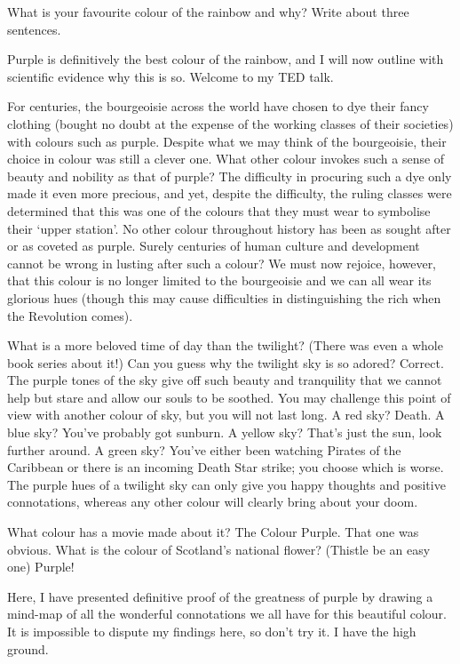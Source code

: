 \documentclass[a4paper,12pt,answers]{exam}
\begin{document}
\begin{questions}
    \newpage
\begin{center}
\end{center}

\question What is your favourite colour of the rainbow and why? Write about three sentences.

Purple is definitively the best colour of the rainbow, and I will now outline with scientific evidence why this is so. 
Welcome to my TED talk. 

For centuries, the bourgeoisie across the world have chosen to dye their fancy clothing (bought no doubt at the expense of the working classes of their societies) with colours such as purple. 
Despite what we may think of the bourgeoisie, their choice in colour was still a clever one. 
What other colour invokes such a sense of beauty and nobility as that of purple?
The difficulty in procuring such a dye only made it even more precious, and yet, despite the difficulty, the ruling classes were determined that this was one of the colours that they must wear to symbolise their `upper station'.
No other colour throughout history has been as sought after or as coveted as purple. 
Surely centuries of human culture and development cannot be wrong in lusting after such a colour?
We must now rejoice, however, that this colour is no longer limited to the bourgeoisie and we can all wear its glorious hues (though this may cause difficulties in distinguishing the rich when the Revolution comes).

What is a more beloved time of day than the twilight? (There was even a whole book series about it!)
Can you guess why the twilight sky is so adored?
Correct. 
The purple tones of the sky give off such beauty and tranquility that we cannot help but stare and allow our souls to be soothed. 
You may challenge this point of view with another colour of sky, but you will not last long. 
A red sky? Death. A blue sky? You've probably got sunburn. A yellow sky? That's just the sun, look further around. A green sky? You've either been watching Pirates of the Caribbean or there is an incoming Death Star strike; you choose which is worse. 
The purple hues of a twilight sky can only give you happy thoughts and positive connotations, whereas any other colour will clearly bring about your doom. 

What colour has a movie made about it? The Colour Purple. 
That one was obvious. 
What is the colour of Scotland's national flower? (Thistle be an easy one) Purple! 

Here, I have presented definitive proof of the greatness of purple by drawing a mind-map of all the wonderful connotations we all have for this beautiful colour. 
It is impossible to dispute my findings here, so don't try it. I have the high ground. 

\end{questions}
\end{document}
